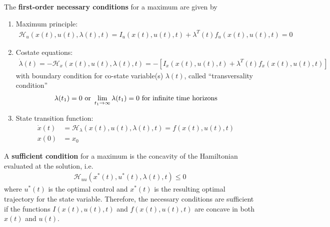 \documentclass[11pt]{elegantbook}
\begin{document}
\begin{proposition}\label{prop:Hamiltonian_FOC}
    The \textbf{first-order necessary conditions} for a maximum are given by
    \begin{enumerate}
        \item Maximum principle:
        \begin{equation}
            \begin{aligned}
                \mathcal{H}_u(x(t),u(t),\lambda(t),t)=I_u(x(t),u(t),t)+\lambda^T(t)f_u(x(t),u(t),t)=0
            \end{aligned}
            \nonumber
        \end{equation}
        \item Costate equations:
        \begin{equation}
            \begin{aligned}
                \dot{\lambda}(t)=-\mathcal{H}_x(x(t),u(t),\lambda(t),t)=-[I_x(x(t),u(t),t)+\lambda^T(t)f_x(x(t),u(t),t)]
            \end{aligned}
            \nonumber
        \end{equation}
        with boundary condition for co-state variable(s) $\lambda(t)$, called
        “transversality condition”
        \begin{equation}
            \begin{aligned}
                \lambda(t_1)=0 \textnormal{ or }\lim_{t_1 \rightarrow \infty}\lambda(t_1)=0 \textnormal{ for infinite time horizons}
            \end{aligned}
            \nonumber
        \end{equation}
        \item State transition function:
        \begin{equation}
            \begin{aligned}
                \dot{x}(t)&=\mathcal{H}_\lambda(x(t),u(t),\lambda(t),t)=f(x(t),u(t),t)\\
                x(0)&=x_0
            \end{aligned}
            \nonumber
        \end{equation}
    \end{enumerate}
    A \textbf{sufficient condition} for a maximum is the concavity of the Hamiltonian evaluated at the solution, i.e.
    \begin{equation}
        \begin{aligned}
            \mathcal{H}_{uu}\left(x^*(t),u^*(t),\lambda(t),t\right)\leq 0
        \end{aligned}
        \nonumber
    \end{equation}
    where $u^*(t)$ is the optimal control and $x^*(t)$ is the resulting optimal trajectory for the state variable. Therefore, the necessary conditions are sufficient if the functions $I(x(t),u(t),t)$ and $f(x(t),u(t),t)$ are concave in both $x(t)$ and $u(t)$.
\end{proposition}
\end{document}
